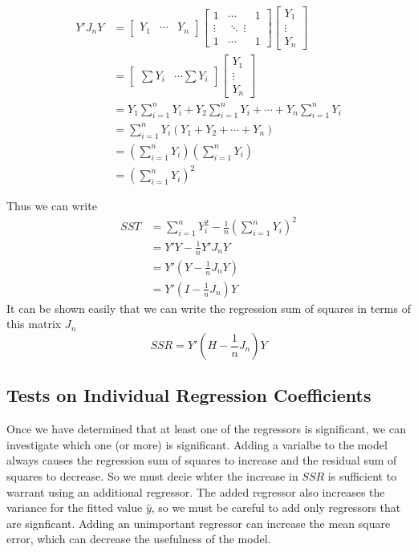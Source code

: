 \begin{align*}
    Y'J_nY &= \begin{bmatrix}
        Y_1 & \cdots & Y_n
    \end{bmatrix} \begin{bmatrix}
        1 & \cdots & 1\\
        \vdots & \ddots \ \vdots \\
        1 & \cdots & 1
    \end{bmatrix}\begin{bmatrix}
        Y_1 \\ \vdots \\ Y_n
    \end{bmatrix} \\
    &= \begin{bmatrix}
        \sum Y_i & \cdots \sum Y_i 
    \end{bmatrix}\begin{bmatrix}
        Y_1 \\ \vdots \\ Y_n
    \end{bmatrix}\\
    &= Y_1 \sum_{i=1}^n Y_i + Y_2 \sum_{i=1}^n Y_i + \cdots + Y_n\sum_{i=1}^n Y_i\\
    &= \sum_{i=1}^n Y_i (Y_1 + Y_2 + \cdots + Y_n)\\
    &= \left(\sum_{i=1}^n Y_i\right) \left(\sum_{i=1}^n Y_i\right)\\
    &= \left(\sum_{i=1}^n Y_i\right)^2
\end{align*}

Thus we can write 
\begin{align*}
    SST &= \sum_{i=1}^n Y_i^2 - \frac{1}{n}\left(\sum_{i=1}^n Y_i\right)^2\\
    &= Y'Y - \frac{1}{n}Y'J_nY\\
    &= Y' \left(Y - \frac{1}{n}J_nY\right)\\
    &= Y' \left(I - \frac{1}{n}J_n\right)Y
\end{align*}
It can be shown easily that we can write the regression sum of squares in terms of this matrix $J_n$ 
\[SSR = Y'\left(H - \frac{1}{n}J_n\right)Y\]

\subsection{Tests on Individual Regression Coefficients}

Once we have determined that at least one of the regressors is significant, we can investigate which one (or more) is significant. Adding a varialbe to the model always causes the regression sum of squares to increase and the residual sum of squares to decrease. So we must decie whter the increase in $SSR$ is sufficient to warrant using an additional regressor. The added regressor also increases the variance for the fitted value $\hat{y}$, so we must be careful to add only regressors that are signficant. Adding an unimportant regressor can increase the mean square error, which can decrease the usefulness of the model.\\

